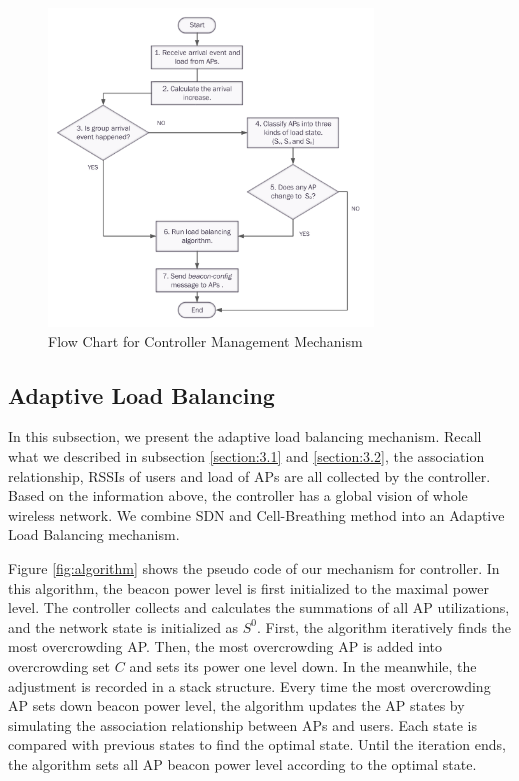 \begin{figure}[tbp]
\begin{center}
\includegraphics[width=3.4in]{images/flowdiagram_trendindicator_controller.pdf}
\end{center}
\caption{ Flow Chart for Controller Management Mechanism}
\label{fig:flowdiagram_trendindicator_controller}
\end{figure}

\subsection{Adaptive Load Balancing}
In this subsection, we present the adaptive load balancing mechanism. Recall what we described in subsection \ref{section:3.1} and \ref{section:3.2}, the association relationship, RSSIs of users and load of APs are all collected by the controller. Based on the information above, the controller has a global vision of whole wireless network. We combine SDN and Cell-Breathing method into an Adaptive Load Balancing mechanism.

 Figure \ref{fig:algorithm} shows the pseudo code of our mechanism for controller. In this algorithm, the beacon power level is first initialized to the maximal power level. The controller collects and calculates the summations of all AP utilizations, and the network state is initialized as $S^0$. First, the algorithm iteratively finds the most overcrowding AP. Then, the most overcrowding AP is added into overcrowding set $C$ and sets its power one level down. In the meanwhile, the adjustment is recorded in a stack structure. Every time the most overcrowding AP sets down beacon power level, the algorithm updates the AP states by simulating the association relationship between APs and users. Each state is compared with previous states to find the optimal state. Until the iteration ends, the algorithm sets all AP beacon power level according to the optimal state.

